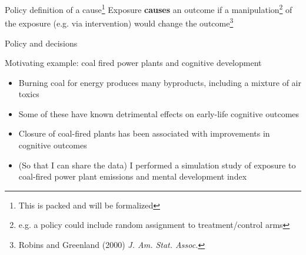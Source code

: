 \begin{frame} [c]{Policy definition of a cause\footnote{This is packed and will be formalized}}
	Exposure \textbf{causes} an outcome if a manipulation\footnote{e.g. a policy could include random assignment to treatment/control arms} of the exposure (e.g. via intervention) would change the outcome\footnote{Robins and Greenland (2000) \emph{J. Am. Stat. Assoc.}}
\end{frame}



\begin{frame} [c]{Policy and decisions}
	\begin{itemize}
	\end{itemize}
\end{frame}


\begin{frame}{Motivating example: coal fired power plants and cognitive development}
	\begin{itemize}
		\item Burning coal for energy produces many byproducts, including a mixture of air toxics
		\item Some of these have known detrimental effects on early-life cognitive outcomes
		\item Closure of coal-fired plants has been associated with improvements in cognitive outcomes
		\item (So that I can share the data) I performed a simulation study of exposure to coal-fired power plant emissions and mental development index
	\end{itemize}
\end{frame}


